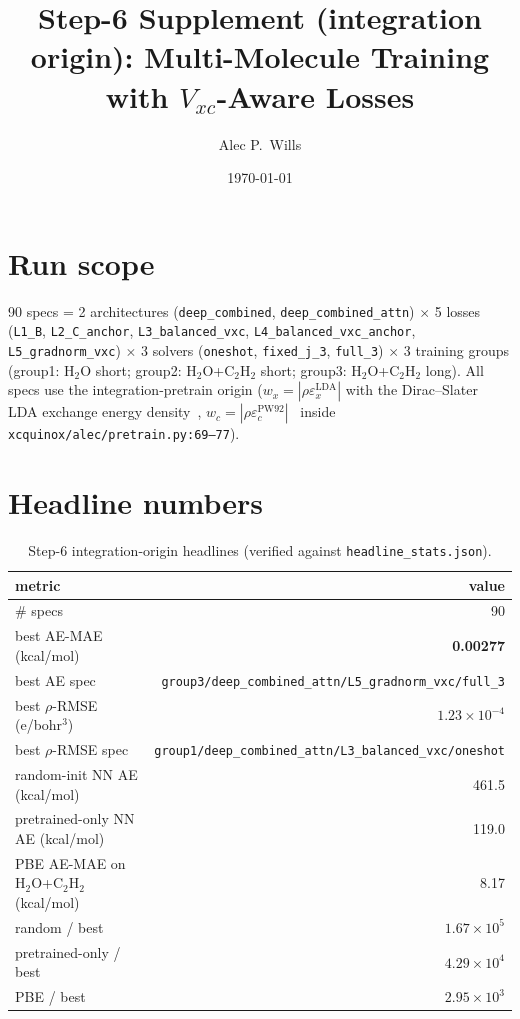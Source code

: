 \documentclass[11pt,letterpaper]{article}
\title{Step-6 Supplement (integration origin): Multi-Molecule Training with
  $V_{xc}$-Aware Losses}
\author{Alec P.\ Wills}
\date{\today}
\begin{document}
\maketitle

\section*{Run scope}
90 specs = 2 architectures (\texttt{deep\_combined}, \texttt{deep\_combined\_attn})
$\times$ 5 losses (\texttt{L1\_B}, \texttt{L2\_C\_anchor}, \texttt{L3\_balanced\_vxc},
\texttt{L4\_balanced\_vxc\_anchor}, \texttt{L5\_gradnorm\_vxc})
$\times$ 3 solvers (\texttt{oneshot}, \texttt{fixed\_j\_3}, \texttt{full\_3})
$\times$ 3 training groups (group1: H$_2$O short; group2: H$_2$O+C$_2$H$_2$ short;
group3: H$_2$O+C$_2$H$_2$ long). All specs use the integration-pretrain origin
($w_x \!=\! |\rho \varepsilon_x^{\text{LDA}}|$ with the Dirac--Slater LDA
exchange energy density~\citep{Dirac1930,Slater1951},
$w_c \!=\! |\rho \varepsilon_c^{\text{PW92}}|$~\citep{PerdewWang1992}
inside \texttt{xcquinox/alec/pretrain.py:69--77}).

\section{Headline numbers}

\begin{table}[h]
\centering
\caption{Step-6 integration-origin headlines (verified against
\texttt{headline\_stats.json}).}
\small
\begin{tabular}{lr}
\toprule
metric & value \\
\midrule
\# specs & 90 \\
best AE-MAE (kcal/mol) & \textbf{0.00277} \\
best AE spec & \texttt{group3/deep\_combined\_attn/L5\_gradnorm\_vxc/full\_3} \\
best $\rho$-RMSE (e/bohr$^3$) & $1.23\!\times\!10^{-4}$ \\
best $\rho$-RMSE spec & \texttt{group1/deep\_combined\_attn/L3\_balanced\_vxc/oneshot} \\
random-init NN AE (kcal/mol) & 461.5 \\
pretrained-only NN AE (kcal/mol) & 119.0 \\
PBE AE-MAE on H$_2$O+C$_2$H$_2$ (kcal/mol) & 8.17 \\
random / best & $1.67\!\times\!10^{5}$ \\
pretrained-only / best & $4.29\!\times\!10^{4}$ \\
PBE / best & $2.95\!\times\!10^{3}$ \\
\bottomrule
\end{tabular}
\end{table}
\end{document}
